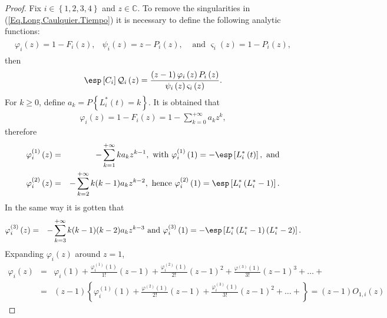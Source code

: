 \begin{proof}
Fix $i\in\left\{1,2,3,4\right\}$ and $z\in\mathbb{C}$. To remove the singularities in (\ref{Eq.Long.Caulquier.Tiempo}) it is necessary to define the following analytic functions:
\begin{eqnarray}
\begin{array}{ccc}
\varphi_{i}\left(z\right)=1-F_{i}\left(z\right),&
\psi_{i}\left(z\right)=z-P_{i}\left(z\right),&\textrm{ and }
\varsigma_{i}\left(z\right)=1-P_{i}\left(z\right),
\end{array}
\end{eqnarray}
then
\begin{eqnarray}
\esp\left[C_{i}\right]\mathcal{Q}_{i}\left(z\right)=\frac{\left(z-1\right)\varphi_{i}\left(z\right)P_{i}\left(z\right)}{\psi_{i}\left(z\right)\varsigma_{i}\left(z\right)}.
\end{eqnarray}
For $k\geq0$, define $a_{k}=P\left\{L_{i}^{*}\left(t\right)=k\right\}$. It is obtained that
\begin{eqnarray*}
\varphi_{i}\left(z\right)=1-F_{i}\left(z\right)=1-\sum_{k=0}^{+\infty}a_{k}z^{k},
\end{eqnarray*}
therefore 
\begin{eqnarray*}
\varphi_{i}^{(1)}\left(z\right)&=&-\sum_{k=1}^{+\infty}ka_{k}z^{k-1},\textrm{ with }\varphi_{i}^{(1)}\left(1\right)=-\esp\left[L_{i}^{*}\left(t\right)\right],\textrm{ and}\\
\varphi_{i}^{(2)}\left(z\right)&=&-\sum_{k=2}^{+\infty}k(k-1)a_{k}z^{k-2},\textrm{ hence }\varphi_{i}^{(2)}\left(1\right)=\esp\left[L_{i}^{*}\left(L_{i}^{*}-1\right)\right].
\end{eqnarray*}
In the same way it is gotten that
\begin{eqnarray*}
\varphi_{i}^{(3)}\left(z\right)&=&-\sum_{k=3}^{+\infty}k(k-1)(k-2)a_{k}z^{k-3}\textrm{ and }\varphi_{i}^{(3)}\left(1\right)=-\esp\left[L_{i}^{*}\left(L_{i}^{*}-1\right)\left(L_{i}^{*}-2\right)\right].
\end{eqnarray*}
Expanding $\varphi_{i}\left(z\right)$ around $z=1$,
\begin{eqnarray*}
\varphi_{i}\left(z\right)&=&\varphi_{i}\left(1\right)+\frac{\varphi_{i}^{(1)}\left(1\right)}{1!}\left(z-1\right)+\frac{\varphi_{i}^{(2)}\left(1\right)}{2!}\left(z-1\right)^{2}+\frac{\varphi^{(3)}\left(1\right)}{3!}\left(z-1\right)^{3}+\ldots+\\
&=&\left(z-1\right)\left\{\varphi_{i}^{(1)}\left(1\right)+\frac{\varphi^{(2)}\left(1\right)}{2!}\left(z-1\right)+\frac{\varphi_{i}^{(3)}\left(1\right)}{3!}\left(z-1\right)^{2}+\ldots+\right\}=\left(z-1\right)O_{1,i}\left(z\right)

\end{eqnarray*}
\end{proof}
